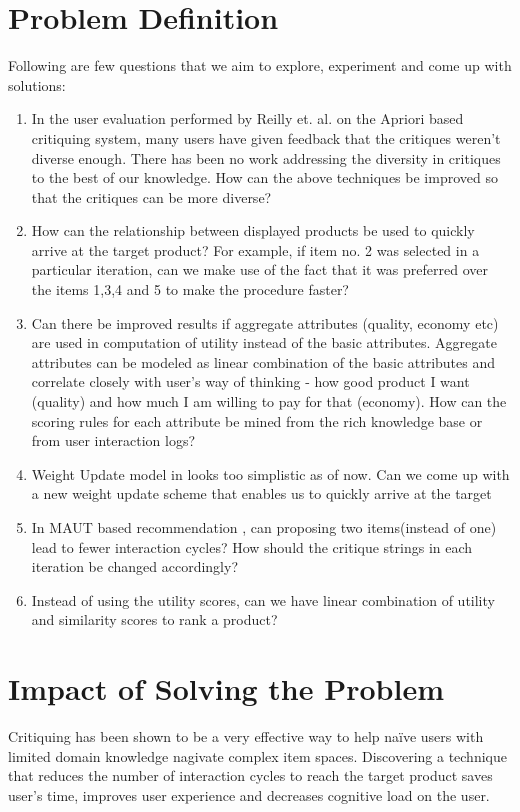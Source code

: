 \documentclass{llncs}
\begin{document}
\section{Problem Definition}
\label{sec:problemStmt}
Following are few questions that we aim to explore, experiment and come up with solutions:\\
\begin{enumerate}
\renewcommand{\labelitemi}{$\bullet$}
\item In the user evaluation performed by Reilly et. al. \cite{reilly2004explaining} on the Apriori based critiquing system, many users have given feedback that the critiques weren't diverse enough. 
There has been no work addressing the diversity in critiques to the best of our knowledge.
How can the above techniques be improved so that the critiques can be more diverse?
\item How can the relationship between displayed products be used to quickly arrive at the target product? For example, if item no. 2 was selected in a particular iteration, can we make use of the fact that it was preferred over the items 1,3,4 and 5 to make the procedure faster?
\item Can there be improved results if aggregate attributes (quality, economy etc) are used in computation of utility instead of the basic attributes. Aggregate attributes can be modeled as linear combination of the basic attributes and correlate closely with user's way of thinking - how good product I want (quality) and how much I am willing to pay for that (economy). How can the scoring rules for each attribute be mined from the rich knowledge base or from user interaction logs?
\item Weight Update model in \cite{zhang} looks too simplistic as of now. Can we come up with a new weight update scheme that enables us to quickly arrive at the target
\item In MAUT based recommendation \cite{zhang}, can proposing two items(instead of one) lead to fewer interaction cycles? How should the critique strings in each iteration be changed accordingly?
\item Instead of using the utility scores, can we have linear combination of utility and similarity scores to rank a product?
\end{enumerate}


\section{Impact of Solving the Problem}
Critiquing has been shown to be a very effective way to help na\"{i}ve users with limited domain knowledge nagivate complex item spaces. 
Discovering a technique that reduces the number of interaction cycles to reach the target product saves user's time, improves user experience and decreases cognitive load on the user. 
\end{document}
